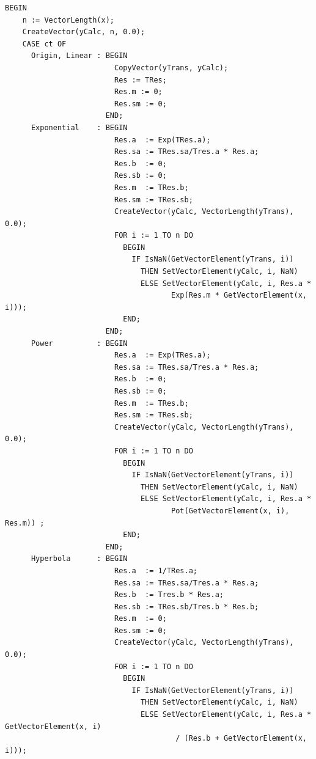 \begin{refsection}
\begin{lstlisting}[caption=Linearisation of curved data]
  BEGIN
    n := VectorLength(x);
    CreateVector(yCalc, n, 0.0);
    CASE ct OF
      Origin, Linear : BEGIN
                         CopyVector(yTrans, yCalc);
                         Res := TRes;
                         Res.m := 0;
                         Res.sm := 0;
                       END;
      Exponential    : BEGIN
                         Res.a  := Exp(TRes.a);
                         Res.sa := TRes.sa/Tres.a * Res.a;
                         Res.b  := 0;
                         Res.sb := 0;
                         Res.m  := TRes.b;
                         Res.sm := TRes.sb;
                         CreateVector(yCalc, VectorLength(yTrans), 0.0);
                         FOR i := 1 TO n DO
                           BEGIN
                             IF IsNaN(GetVectorElement(yTrans, i))
                               THEN SetVectorElement(yCalc, i, NaN)
                               ELSE SetVectorElement(yCalc, i, Res.a *
                                      Exp(Res.m * GetVectorElement(x, i)));
                           END;
                       END;
      Power          : BEGIN
                         Res.a  := Exp(TRes.a);
                         Res.sa := TRes.sa/Tres.a * Res.a;
                         Res.b  := 0;
                         Res.sb := 0;
                         Res.m  := TRes.b;
                         Res.sm := TRes.sb;
                         CreateVector(yCalc, VectorLength(yTrans), 0.0);
                         FOR i := 1 TO n DO
                           BEGIN
                             IF IsNaN(GetVectorElement(yTrans, i))
                               THEN SetVectorElement(yCalc, i, NaN)
                               ELSE SetVectorElement(yCalc, i, Res.a *
                                      Pot(GetVectorElement(x, i), Res.m)) ;
                           END;
                       END;
      Hyperbola      : BEGIN
                         Res.a  := 1/TRes.a;
                         Res.sa := TRes.sa/Tres.a * Res.a;
                         Res.b  := Tres.b * Res.a;
                         Res.sb := TRes.sb/Tres.b * Res.b;
                         Res.m  := 0;
                         Res.sm := 0;
                         CreateVector(yCalc, VectorLength(yTrans), 0.0);
                         FOR i := 1 TO n DO
                           BEGIN
                             IF IsNaN(GetVectorElement(yTrans, i))
                               THEN SetVectorElement(yCalc, i, NaN)
                               ELSE SetVectorElement(yCalc, i, Res.a * GetVectorElement(x, i)
                                       / (Res.b + GetVectorElement(x, i)));

\end{lstlisting}
\end{refsection}
